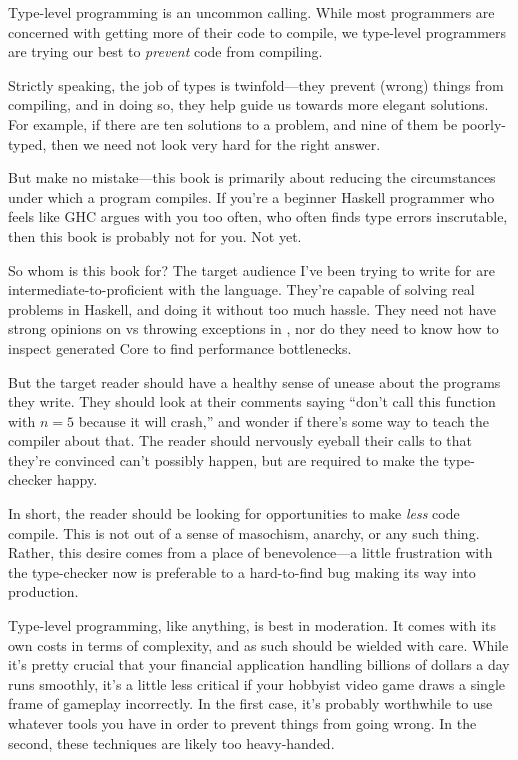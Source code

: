 \documentclass[book.tex]{subfiles}
\begin{document}

Type-level programming is an uncommon calling. While most programmers are
concerned with getting more of their code to compile, we type-level programmers
are trying our best to \emph{prevent} code from compiling.

Strictly speaking, the job of types is twinfold---they prevent (wrong) things
from compiling, and in doing so, they help guide us towards more elegant
solutions. For example, if there are ten solutions to a problem, and nine of
them be poorly-typed, then we need not look very hard for the right answer.

But make no mistake---this book is primarily about reducing the circumstances
under which a program compiles. If you're a beginner Haskell programmer who
feels like GHC argues with you too often, who often finds type errors
inscrutable, then this book is probably not for you. Not yet.

So whom is this book for? The target audience I've been trying to write for are
intermediate-to-proficient with the language. They're capable of solving real
problems in Haskell, and doing it without too much hassle. They need not have
strong opinions on  vs throwing exceptions in , nor do they
need to know how to inspect generated Core to find performance bottlenecks.

But the target reader should have a healthy sense of unease about the programs
they write. They should look at their comments saying ``don't call this function
with $n=5$ because it will crash,'' and wonder if there's some way to teach the
compiler about that. The reader should nervously eyeball their calls to
 that they're convinced can't possibly happen, but are required to
make the type-checker happy.

In short, the reader should be looking for opportunities to make \emph{less}
code compile. This is not out of a sense of masochism, anarchy, or any such
thing. Rather, this desire comes from a place of benevolence---a little
frustration with the type-checker now is preferable to a hard-to-find bug making
its way into production.

Type-level programming, like anything, is best in moderation. It comes with its
own costs in terms of complexity, and as such should be wielded with care. While
it's pretty crucial that your financial application handling billions of dollars
a day runs smoothly, it's a little less critical if your hobbyist video game
draws a single frame of gameplay incorrectly. In the first case, it's probably
worthwhile to use whatever tools you have in order to prevent things from going
wrong. In the second, these techniques are likely too heavy-handed.
\end{document}

